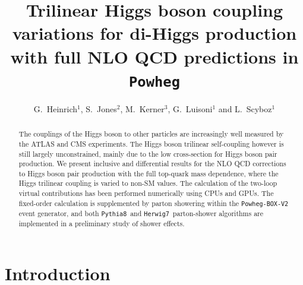 \documentclass[a4paper]{jpconf}
\newcommand{\pythia}{\texttt{Pythia8}}
\newcommand{\herwig}{\texttt{Herwig7}}
\begin{document}
\title{Trilinear Higgs boson coupling variations for di-Higgs production with full NLO QCD predictions in \texttt{Powheg}}

\author{G.~Heinrich$^1$, S.~Jones$^2$, M.~Kerner$^3$, G.~Luisoni$^1$ and L.~Scyboz$^1$}

\address{$^1$ Max-Planck-Institut f\"ur Physik, F\"ohringer Ring 6, 80805 M\"unchen, Germany}
\address{$^2$ Theoretical Physics Department, CERN, Geneva, Switzerland}
\address{$^3$ Physik-Institut, Universit\"at Z\"urich, Winterthurerstrasse 190, 8057 Z\"urich, Switzerland}


\begin{abstract}
The couplings of the Higgs boson to other particles are increasingly well measured by the ATLAS and CMS experiments. The Higgs boson trilinear self-coupling however is still largely unconstrained,  mainly due to the low cross-section for Higgs boson pair production. We present inclusive and differential results for the NLO QCD corrections to Higgs boson pair production with the full top-quark mass dependence, where the Higgs trilinear coupling is varied to non-SM values. The calculation of the two-loop virtual contributions has been performed numerically using CPUs and GPUs. The fixed-order calculation is supplemented by parton showering within the \texttt{Powheg-BOX-V2} event generator, and both \pythia~and \herwig~parton-shower algorithms are implemented in a preliminary study of shower effects.
\end{abstract}


\section{Introduction}
\end{document}
